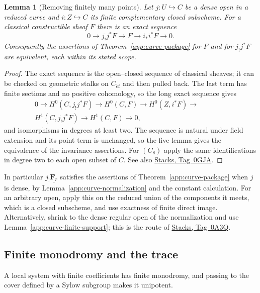 \documentclass[11pt,a4paper]{article}
\numberwithin{equation}{section}
\newtheorem{lemma}[theorem]{Lemma}
\theoremstyle{definition}
\theoremstyle{remark}
\newcommand{\et}{\acute{e}t}
\newcommand{\stacks}[1]{\href{https://stacks.math.columbia.edu/tag/#1}{\textnormal{Stacks, Tag~#1}}}
\begin{document}
\begin{lemma}[Removing finitely many points]
\label{app:curve-dense-open}
Let $j\colon U\hookrightarrow C$ be a dense open in a reduced curve and
$i\colon Z\hookrightarrow C$ its finite complementary closed subscheme.
For a classical constructible sheaf $F$ there is an exact sequence
\[
 0\longrightarrow j_!j^*F\longrightarrow F
 \longrightarrow i_*i^*F\longrightarrow0.
\]
Consequently the assertions of Theorem~\ref{app:curve-package} for $F$
and for $j_!j^*F$ are equivalent, each within its stated scope.
\end{lemma}
\begin{proof}
The exact sequence is the open--closed sequence of classical sheaves;
it can be checked on geometric stalks on $C_{\et}$ and then pulled
back.  The last term has finite sections and no positive cohomology,
so the long exact sequence gives
\[
 \begin{split}
 0\to H^0(C,j_!j^*F)\to H^0(C,F)\to H^0(Z,i^*F)\to{}\qquad\qquad\\
 H^1(C,j_!j^*F)\to H^1(C,F)\to0,
 \end{split}
\]
and isomorphisms in degrees at least two.  The sequence is natural
under field extension and its point term is unchanged, so the five
lemma gives the equivalence of the invariance assertions.  For $(C_8)$
apply the same identifications in degree two to each open subset of
$C$.  See also \stacks{0GJA}.
\end{proof}

In particular $j_!\underline{\mathbf F_r}$ satisfies the assertions of
Theorem~\ref{app:curve-package} when $j$ is dense, by
Lemma~\ref{app:curve-normalization} and the constant calculation.  For
an arbitrary open, apply this on the reduced union of the components it
meets, which is a closed subscheme, and use exactness of finite direct
image.  Alternatively, shrink to the dense regular open of the
normalization and use Lemma~\ref{app:curve-finite-support}; this is the
route of \stacks{0A3Q}.

\subsection{Finite monodromy and the trace}

A local system with finite coefficients has finite monodromy, and
passing to the cover defined by a Sylow subgroup makes it unipotent.
\end{document}

